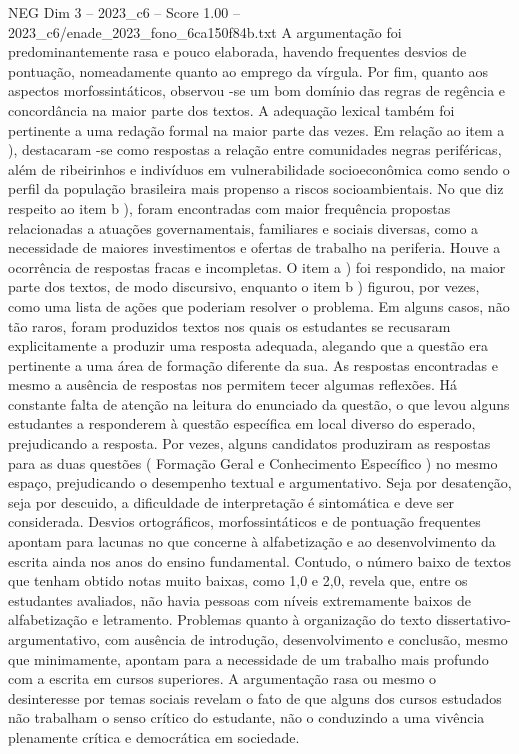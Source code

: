 \begin{textsample}{NEG Dim 3 – 2023\_c6 – Score 1.00 – 2023\_c6/enade\_2023\_fono\_6ca150f84b.txt}
A argumentação foi predominantemente rasa e pouco elaborada, havendo frequentes desvios de pontuação, nomeadamente quanto ao emprego da vírgula.
Por fim, quanto aos aspectos morfossintáticos, observou -se um bom domínio das regras de regência e concordância na maior parte dos textos.
A adequação lexical também foi pertinente a uma redação formal na maior parte das vezes.
Em relação ao item a ), destacaram -se como respostas a relação entre comunidades negras periféricas, além de ribeirinhos e indivíduos em vulnerabilidade socioeconômica como sendo o perfil da população brasileira mais propenso a riscos socioambientais.
No que diz respeito ao item b ), foram encontradas com maior frequência propostas relacionadas a atuações governamentais, familiares e sociais diversas, como a necessidade de maiores investimentos e ofertas de trabalho na periferia.
Houve a ocorrência de respostas fracas e incompletas.
O item a ) foi respondido, na maior parte dos textos, de modo discursivo, enquanto o item b ) figurou, por vezes, como uma lista de ações que poderiam resolver o problema.
Em alguns casos, não tão raros, foram produzidos textos nos quais os estudantes se recusaram explicitamente a produzir uma resposta adequada, alegando que a questão era pertinente a uma área de formação diferente da sua.
As respostas encontradas e mesmo a ausência de respostas nos permitem tecer algumas reflexões.
Há constante falta de atenção na leitura do enunciado da questão, o que levou alguns estudantes a responderem à questão específica em local diverso do esperado, prejudicando a resposta.
Por vezes, alguns candidatos produziram as respostas para as duas questões ( Formação Geral e Conhecimento Específico ) no mesmo espaço, prejudicando o desempenho textual e argumentativo.
Seja por desatenção, seja por descuido, a dificuldade de interpretação é sintomática e deve ser considerada.
Desvios ortográficos, morfossintáticos e de pontuação frequentes apontam para lacunas no que concerne à alfabetização e ao desenvolvimento da escrita ainda nos anos do ensino fundamental.
Contudo, o número baixo de textos que tenham obtido notas muito baixas, como 1,0 e 2,0, revela que, entre os estudantes avaliados, não havia pessoas com níveis extremamente baixos de alfabetização e letramento.
Problemas quanto à organização do texto dissertativo-argumentativo, com ausência de introdução, desenvolvimento e conclusão, mesmo que minimamente, apontam para a necessidade de um trabalho mais profundo com a escrita em cursos superiores.
A argumentação rasa ou mesmo o desinteresse por temas sociais revelam o fato de que alguns dos cursos estudados não trabalham o senso crítico do estudante, não o conduzindo a uma vivência plenamente crítica e democrática em sociedade.

\end{textsample}
